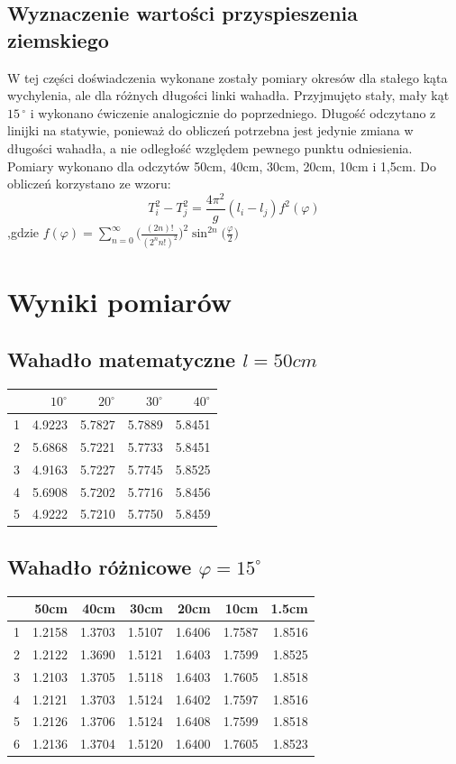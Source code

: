 \documentclass[a4paper,10pt]{article}
\begin{document}
\subsection{Wyznaczenie wartości przyspieszenia ziemskiego}
W tej części doświadczenia wykonane zostały pomiary okresów dla stałego kąta wychylenia, ale dla różnych długości linki wahadła. Przyjmujęto stały, mały kąt $15\,^{\circ}$ i wykonano ćwiczenie analogicznie do poprzedniego. Długość odczytano z linijki na statywie, ponieważ do obliczeń potrzebna jest jedynie zmiana w długości wahadła, a nie odległość względem pewnego punktu odniesienia. Pomiary wykonano dla odczytów 50cm, 40cm, 30cm, 20cm, 10cm i 1,5cm. Do obliczeń korzystano ze wzoru:
\begin{equation}
T_i^2-T_j^2 = \frac{4\pi^2}{g}(l_i-l_j)f^2(\varphi)
\end{equation}
,gdzie $f(\varphi)=\sum_{n=0}^{\infty}\bigg(\frac{(2n)!}{(2^nn!)^2}\bigg)^2\sin^{2n}\bigg(\frac{\varphi}{2}\bigg)$

\section{Wyniki pomiarów}
\subsection{Wahadło matematyczne $l=50cm$}
\begin{tabular}{lrrrr}
\toprule
{} &    $10^\circ$ &     $20^\circ$ &      $30^\circ$ &      $40^\circ$\\
\midrule
1 &  4.9223 &  5.7827 &  5.7889 &  5.8451 \\
2 &  5.6868 &  5.7221 &  5.7733 &  5.8451 \\
3 &  4.9163 &  5.7227 &  5.7745 &  5.8525 \\
4 &  5.6908 &  5.7202 &  5.7716 &  5.8456 \\
5 &  4.9222 &  5.7210 &  5.7750 &  5.8459 \\
\bottomrule
\end{tabular}
\subsection{Wahadło różnicowe $\varphi = 15^\circ$}
\begin{tabular}{lrrrrrr}
\toprule
{} &      50cm &      40cm &      30cm &      20cm &      10cm &     1.5cm \\
\midrule
1 &  1.2158 &  1.3703 &  1.5107 &  1.6406 &  1.7587 &  1.8516 \\
2 &  1.2122 &  1.3690 &  1.5121 &  1.6403 &  1.7599 &  1.8525 \\
3 &  1.2103 &  1.3705 &  1.5118 &  1.6403 &  1.7605 &  1.8518 \\
4 &  1.2121 &  1.3703 &  1.5124 &  1.6402 &  1.7597 &  1.8516 \\
5 &  1.2126 &  1.3706 &  1.5124 &  1.6408 &  1.7599 &  1.8518 \\
6 &  1.2136 &  1.3704 &  1.5120 &  1.6400 &  1.7605 &  1.8523 \\
\bottomrule
\end{tabular}
\end{document}
